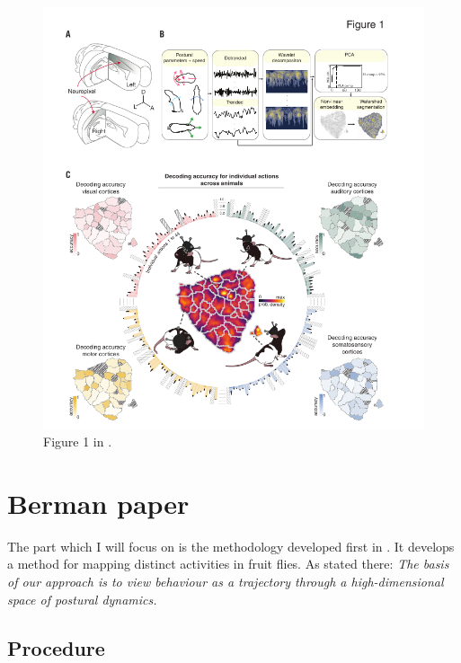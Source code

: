 \documentclass{article}
\theoremstyle{plain}
\theoremstyle{definition}
\theoremstyle{remark}
\begin{document}
\begin{figure}[h]
        \centering
        \includegraphics[width=\linewidth]{./figures/methodology_mimica.png}
        \caption{Figure 1 in \cite{Mimica}.}
        \label{fig:methodology_mimica}
\end{figure}

\section{Berman paper}
The part which I will focus on is the methodology developed first in \cite{Berman}.
It develops a method for mapping distinct activities in fruit flies.
As stated there: \textit{The basis of our approach is to view behaviour as a trajectory through a high-dimensional space of postural dynamics.}

\subsection{Procedure}
\end{document}
